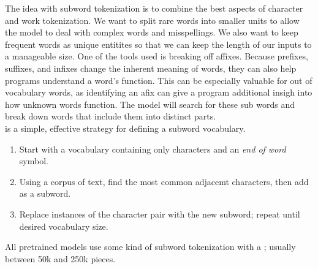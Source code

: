 \documentclass{article}
\begin{document}
 The idea with subword tokenization is to combine the best aspects of character and work tokenization. We want to split rare words into smaller units to allow the model to deal with complex words and misspellings. We also want to keep frequent words as unique entitites so that we can keep the length of our inputs to a manageable size. One of the tools used is breaking off affixes. Because prefixes, suffixes, and infixes change the inherent meaning of words, they can also help programs understand a word's function. This can be especially valuable for out of vocabulary words, as identifying an afix can give a program additional insigh into how unknown words function. The  model will search for these sub words and break down words that include them into distinct parts. \\ 

  is a simple, effective strategy for defining a subword vocabulary. 
 \begin{enumerate}
   \item Start with a vocabulary containing only characters and an \emph{end of word} symbol. 
   \item Using a corpus of text, find the most common adjacemt characters, then add as a subword. 
   \item Replace instances of the character pair with the new subword; repeat until desired vocabulary size. 
 \end{enumerate}
All pretrained models use some kind of subword tokenization with a ; usually between 50k and 250k pieces. 
\end{document}
